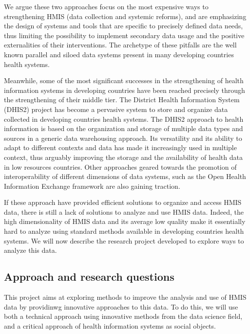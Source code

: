 We argue these two approaches focus on the most expensive ways to strengthening HMIS (data collection and systemic reforms), and are emphasizing the design of systems and tools that are specific to precisely defined data needs, thus limiting the possibility to implement secondary data usage and the positive externalities of their interventions. The archetype of these pitfalls are the well known parallel and siloed data systems present in many developing countries health systems.

Meanwhile, some of the most significant successes in the strengthening of health information systems in developing countries have been reached precisely through the strengthening of their middle tier. The District Health Information System (DHIS2) project has become a pervasive system to store and organize data collected in developing countries health systems. The DHIS2 approach to health information is based on the organization and storage of multiple data types and sources in a generic data warehousing approach. Its versatility and its ability to adapt to different contexts and data has made it increasingly used in multiple context, thus arguably improving the storage and the availability of health data in low resources countries. Other approaches geared towards the promotion of interoperability of different dimensions of data systems, such as the Open Health Information Exchange framework are also gaining traction.

If these approach have provided efficient solutions to organize and access HMIS data, there is still a lack of solutions to analyze and use HMIS data. Indeed, the high dimensionality of HMIS data and its average low quality make it essentially hard to analyze using standard methods available in developing countries health systems. We will now describe the research project developed to explore ways to analyze this data.


\subsection{Approach and research questions}




This project aims at exploring methods to improve the analysis and use of HMIS data by providinwg innovative approaches to this data. To do this, we will use both a technical approach using innovative methods from the data science field, and a critical approach of health information systems as social objects.

